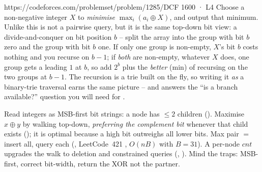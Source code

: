 \begin{practiceset}
    {https://codeforces.com/problemset/problem/1285/D}{CF 1600 · L4}
    {Choose a non-negative integer $X$ to \emph{minimise} $\max_i (a_i \oplus X)$, and output that minimum.
    Unlike  this is not a pairwise query, but it is the same top-down bit view: a
    divide-and-conquer on bit position $b$ -- split the array into the group with bit $b$ zero and the
    group with bit $b$ one. If only one group is non-empty, $X$'s bit $b$ costs nothing and you recurse on
    $b-1$; if \emph{both} are non-empty, whatever $X$ does, one group gets a leading $1$ at $b$, so add
    $2^b$ plus the \emph{better} (min) of recursing on the two groups at $b-1$. The recursion is a trie
    built on the fly, so writing it \emph{as} a binary-trie traversal earns the same picture -- and answers
    the ``is a branch available?'' question you will need for .}
\end{practiceset}

\begin{recallbox}
Read integers as MSB-first bit strings: a node has $\le 2$ children (). Maximise
$x\oplus y$ by walking top-down, \emph{preferring the complement bit} whenever that child exists
(); it is optimal because a high bit outweighs all lower bits. Max pair $=$ insert
all, query each (, LeetCode~421 , $O(nB)$ with $B=31$). A per-node
$\mathit{cnt}$ upgrades the walk to deletion and constrained queries (,
). Mind the traps: MSB-first, correct bit-width, return the XOR not the partner.
\end{recallbox}
